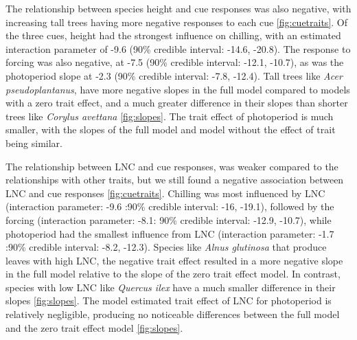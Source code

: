 \documentclass{article}\usepackage[]{graphicx}\usepackage[]{color}
\begin{document}
The relationship between species height and cue responses was also negative, with increasing tall trees having more negative responses to each cue \ref{fig:cuetraits}. Of the three cues, height had the strongest influence on chilling, with an estimated interaction parameter of -9.6 (90\% credible interval: -14.6, -20.8). The response to forcing was also negative, at -7.5 (90\% credible interval: -12.1, -10.7), as was the photoperiod slope at -2.3 (90\% credible interval: -7.8, -12.4). Tall trees like \textit{Acer pseudoplantanus}, have more negative slopes in the full model compared to models with a zero trait effect, and a much greater difference in their slopes than shorter trees like \textit{Corylus avettana} \ref{fig:slopes}. The trait effect of photoperiod is much smaller, with the slopes of the full model and model without the effect of trait being similar. 

The relationship between LNC and cue responses, was weaker compared to the relationships with other traits, but we still found a negative association between LNC and cue responses \ref{fig:cuetraits}. Chilling was most influenced by LNC (interaction parameter: -9.6 :90\% credible interval: -16, -19.1), followed by the forcing (interaction parameter: -8.1: 90\% credible interval: -12.9, -10.7), while photoperiod had the smallest influence from LNC (interaction parameter: -1.7 :90\% credible interval: -8.2, -12.3). Species like \textit{Alnus glutinosa} that produce leaves with high LNC, the negative trait effect resulted in a more negative slope in the full model relative to the slope of the zero trait effect model. In contrast, species with low LNC like \textit{Quercus ilex} have a much smaller difference in their slopes \ref{fig:slopes}. The model estimated trait effect of LNC for photoperiod is relatively negligible, producing no noticeable differences between the full model and the zero trait effect model  \ref{fig:slopes}. 
\end{document}
